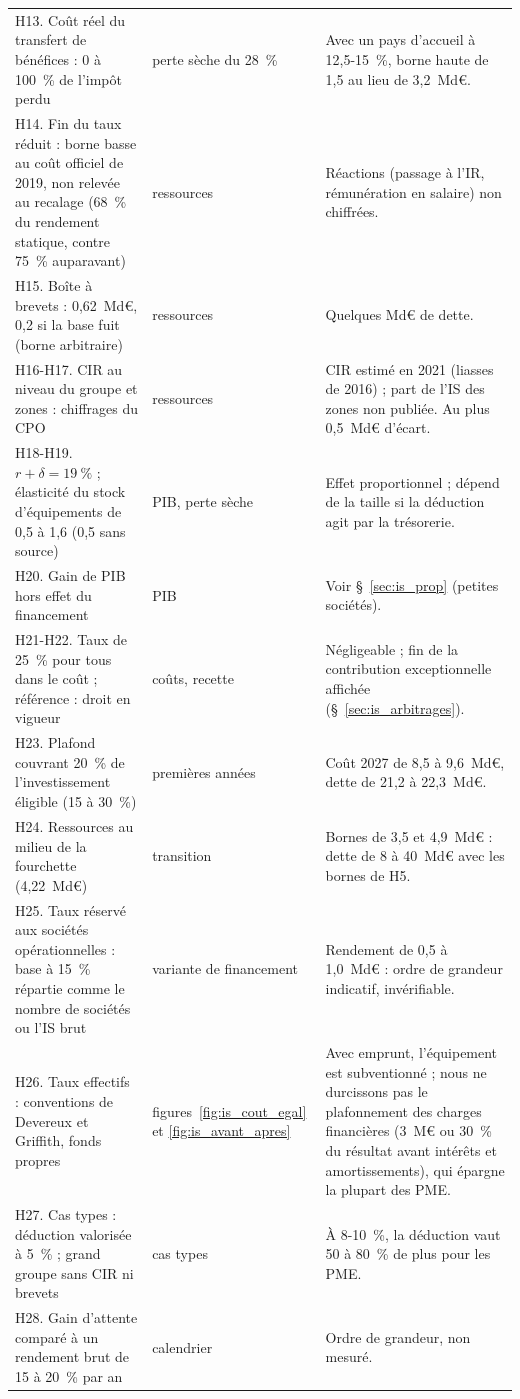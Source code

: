 \documentclass[11pt,a4paper]{article}
\begin{document}
\begin{table}[!htbp]
\begin{tabularx}{\linewidth}{@{}>{\raggedright\arraybackslash}p{4.4cm}>{\raggedright\arraybackslash}p{2.4cm}>{\raggedright\arraybackslash}X@{}}
H13. Coût réel du transfert de bénéfices : 0 à 100~\% de l'impôt perdu & perte sèche du 28~\% & Avec un pays d'accueil
à 12,5-15~\%, borne haute de 1,5 au lieu de 3,2~Md€. \\
H14. Fin du taux réduit : borne basse au coût officiel de 2019, non relevée au recalage (68~\% du rendement statique,
contre 75~\% auparavant) & ressources & Réactions (passage à l'IR, rémunération en
salaire) non chiffrées. \\
H15. Boîte à brevets : 0,62~Md€, 0,2 si la base fuit (borne arbitraire) & ressources & Quelques Md€ de dette. \\
H16-H17. CIR au niveau du groupe et zones : chiffrages du CPO & ressources & CIR estimé en 2021 (liasses de 2016) ;
part de l'IS des zones non publiée. Au plus 0,5~Md€ d'écart. \\
H18-H19. $r+\delta = 19~\%$ ; élasticité du stock d'équipements de 0,5 à 1,6 (0,5 sans source) & PIB, perte sèche &
Effet proportionnel ; dépend de la taille si la déduction agit par la trésorerie. \\
H20. Gain de PIB hors effet du financement & PIB & Voir §~\ref{sec:is_prop} (petites sociétés). \\
H21-H22. Taux de 25~\% pour tous dans le coût ; référence : droit en vigueur & coûts, recette & Négligeable ; fin de la
contribution exceptionnelle affichée (§~\ref{sec:is_arbitrages}). \\
H23. Plafond couvrant 20~\% de l'investissement éligible (15 à 30~\%) & premières années & Coût 2027 de 8,5 à
9,6~Md€, dette de 21,2 à 22,3~Md€. \\
H24. Ressources au milieu de la fourchette (4,22~Md€) & transition & Bornes de 3,5 et 4,9~Md€ : dette de 8 à 40~Md€
avec les bornes de H5. \\
H25. Taux réservé aux sociétés opérationnelles : base à 15~\% répartie comme le nombre de sociétés ou l'IS brut &
variante de financement & Rendement de 0,5 à 1,0~Md€ : ordre de grandeur indicatif, invérifiable. \\
H26. Taux effectifs : conventions de Devereux et Griffith, fonds propres & figures~\ref{fig:is_cout_egal} et
\ref{fig:is_avant_apres} & Avec emprunt, l'équipement est subventionné ; nous ne durcissons pas le plafonnement des
charges financières (3~M€ ou 30~\% du résultat avant intérêts et amortissements), qui épargne la plupart des PME. \\
H27. Cas types : déduction valorisée à 5~\% ; grand groupe sans CIR ni brevets & cas types & À 8-10~\%, la déduction
vaut 50 à 80~\% de plus pour les PME. \\
H28. Gain d'attente comparé à un rendement brut de 15 à 20~\% par an & calendrier & Ordre de grandeur, non mesuré. \\
\bottomrule
\end{tabularx}
\end{table}
\end{document}
